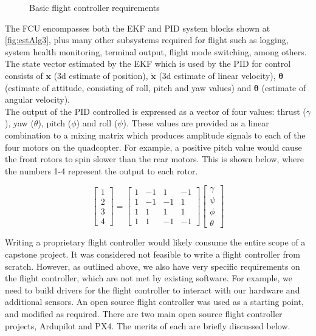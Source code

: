 \documentclass[capstone_report.tex]{subfiles}
\begin{document}
\begin{figure}[H]
	\centering
	   	
	   	\caption{Basic flight controller requirements\label{fig:FCU}}
\end{figure}

The FCU encompasses both the EKF and PID system blocks shown at \ref{fig:estAlg3}, plus many other subsystems required for flight such as logging, system health monitoring, terminal output, flight mode switching, among others. The state vector estimated by the EKF which is used by the PID for control consists of $\bm{x}$ (3d estimate of position), $\bm{\dot{x}}$ (3d estimate of linear velocity), $\bm{\theta}$ (estimate of attitude, consisting of roll, pitch and yaw values) and $\bm{\dot{\theta}}$ (estimate of angular velocity). \\

The output of the PID controlled is expressed as a vector of four values: thrust ($\gamma$), yaw ($\theta$), pitch ($\phi$) and roll ($\psi$). These values are provided as a linear combination to a mixing matrix which produces amplitude signals to each of the four motors on the quadcopter. For example, a positive pitch value would cause the front rotors to spin slower than the rear motors. This is shown below, where the numbers 1-4 represent the output to each rotor.

\[
    \begin{bmatrix}1\\2\\3\\4\end{bmatrix}= \begin{bmatrix}1&-1&1&-1\\1&-1&-1&1\\1&1&1&1\\1&1&-1&-1\end{bmatrix} \begin{bmatrix}\gamma\\ \psi \\ \phi \\ \theta \end{bmatrix}
\]

Writing a proprietary flight controller would likely consume the entire scope of a capstone project. It was considered not feasible to write a flight controller from scratch. However, as outlined above, we also have very specific requirements on the flight controller, which are not met by existing software. For example, we need to build drivers for the flight controller to interact with our hardware and additional sensors.  An open source flight controller was used as a starting point, and modified as required. There are two main open source flight controller projects, Ardupilot and PX4. The merits of each are briefly discussed below.
\end{document}
